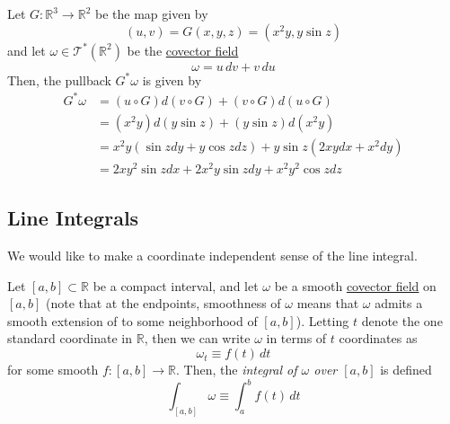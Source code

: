 \documentclass{article}
\newcounter{definition}[section]
\newcounter{example}[section]
\begin{document}
    \begin{example}
      \label{ex:computing-a-pullback}
    Let $G: \mathbb{R}^3 \to \mathbb{R}^2$ be the map given by 
    \begin{equation}
      (u, v) = G(x, y, z) = (x^2 y, y \sin{z})
    \end{equation}
    and let $\omega \in \mathcal{T}^*(\mathbb{R}^2)$ be the \hyperref[def:covector-field]{covector field} 
    \begin{equation}
      \omega = u \,dv + v\,du
    \end{equation}
    Then, the pullback $G^* \omega$ is given by 
    \begin{align*}
        G^* \omega & = (u \circ G) d(v \circ G) + (v \circ G) d (u \circ G) \\
        & = (x^2 y) d(y \sin{z}) + (y \sin{z}) d (x^2 y) \\
        & = x^2 y (\sin{z} dy + y \cos{z} dz) + y \sin{z} (2xy dx + x^2 dy) \\
        & = 2xy^2 \sin{z} dx + 2x^2 y \sin{z} dy + x^2 y^2 \cos{z} dz
    \end{align*}
    \end{example}

  \subsection{Line Integrals}

    We would like to make a coordinate independent sense of the line integral. 

    \begin{definition}
      \label{def:integral-of-a-covector-field-over-an-interval}
    Let $[a, b] \subset \mathbb{R}$ be a compact interval, and let $\omega$ be a smooth \hyperref[def:covector-field]{covector field} on $[a,b]$ (note that at the endpoints, smoothness of $\omega$ means that $\omega$ admits a smooth extension of to some neighborhood of $[a,b]$). Letting $t$ denote the one standard coordinate in $\mathbb{R}$, then we can write $\omega$ in terms of $t$ coordinates as 
    \begin{equation}
      \omega_t \equiv f(t)\,dt
    \end{equation}
    for some smooth $f: [a,b] \to \mathbb{R}$. Then, the \textit{integral of $\omega$ over $[a,b]$} is defined 
    \begin{equation}
      \int_{[a,b]} \omega \equiv \int_a^b f(t)\,dt
    \end{equation}
    \end{definition}
\end{document}
